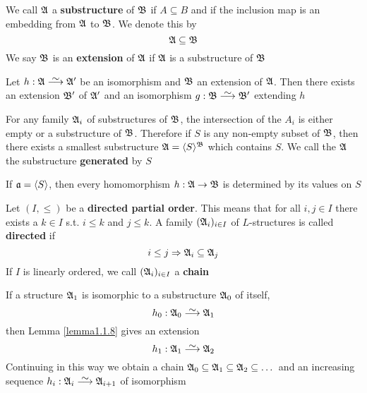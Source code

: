 \documentclass[11pt]{article}
\begin{document}
\begin{definition}[]
We call \(\mathfrak{A}\) a \textbf{substructure} of \(\mathfrak{B}\) if \(A\subseteq B\) and if the inclusion map is an embedding
from \(\mathfrak{A}\) to \(\mathfrak{B}\). We denote this by
\begin{equation*}
\mathfrak{A}\subseteq\mathfrak{B}
\end{equation*}
We say \(\mathfrak{B}\) is an \textbf{extension} of \(\mathfrak{A}\) if \(\mathfrak{A}\) is a substructure of \(\mathfrak{B}\)
\end{definition}




\begin{lemma}[]
\label{lemma1.1.8}
Let \(h:\fA \isoto\fA'\) be an isomorphism and \(\mathfrak{B}\) an
extension of \(\mathfrak{A}\). Then there exists an extension \(\mathfrak{B}'\) of \(\mathfrak{A}'\) and
an isomorphism \(g:\fB \isoto\fB'\) extending \(h\)
\end{lemma}

For any family \(\mathfrak{A}_i\) of substructures of \(\mathfrak{B}\), the intersection of the
\(A_i\) is either empty or a substructure of \(\mathfrak{B}\). Therefore if \(S\) is
any non-empty subset of \(\mathfrak{B}\), then there exists a smallest substructure
\(\mathfrak{A}=\langle S\rangle^{\mathfrak{B}}\) which contains \(S\). We call the \(\mathfrak{A}\) the
substructure \textbf{generated} by \(S\)

\begin{lemma}[]
If \(\mathfrak{a}=\langle S\rangle\), then every homomorphism \(h:\mathfrak{A}\to\mathfrak{B}\) is determined by
its values on \(S\)
\end{lemma}

\begin{definition}[]
Let \((I,\le)\) be a \textbf{directed partial order}. This means that for all
\(i,j\in I\) there exists a \(k\in I\) s.t. \(i\le k\) and \(j\le k\). A
family \((\mathfrak{A}_i)_{i\in I}\) of \(L\)-structures is called \textbf{directed} if
\begin{equation*}
i\le j\Rightarrow\mathfrak{A}_i\subseteq\mathfrak{A}_j
\end{equation*}
If \(I\) is linearly ordered, we call \((\mathfrak{A}_i)_{i\in I}\) a \textbf{chain}
\end{definition}

If a structure \(\mathfrak{A}_1\) is isomorphic to a substructure \(\mathfrak{A}_0\) of itself,
\begin{equation*}
 h_0:\fA_0\isoto\fA_1
\end{equation*}
then Lemma \ref{lemma1.1.8} gives an extension
\begin{equation*}
 h_1:\fA_1\isoto\fA_2
\end{equation*}
Continuing in this way we obtain a chain 
\(\mathfrak{A}_0\subseteq \mathfrak{A}_1\subseteq\mathfrak{A}_2\subseteq\dots\)
and an increasing sequence
\(h_i:\fA_i\isoto\fA_{i+1}\) of isomorphism
\end{document}
